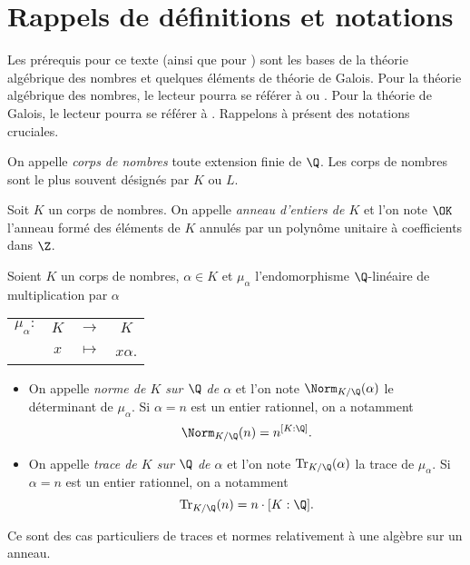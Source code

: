 \section*{Rappels de définitions et notations}\label{section-notations}

Les prérequis pour ce texte (ainsi que pour \cite{article}) sont les bases de la théorie algébrique des nombres et quelques éléments de théorie de Galois. Pour la théorie algébrique des nombres, le lecteur pourra se référer à \cite[ch. II, III, V et VI]{Samuel} ou \cite[ch. II, III et IV]{Kraus}. Pour la théorie de Galois, le lecteur pourra se référer à \cite[ch. XXIII à XVII]{GrandCombat}. Rappelons à présent des notations cruciales.

\begin{rappel}
	On appelle \emph{corps de nombres} toute extension finie de $\Q$. Les corps de nombres sont le plus souvent désignés par $K$ ou $L$.
\end{rappel}

\begin{rappel}
	Soit $K$ un corps de nombres. On appelle \emph{anneau d'entiers de $K$} et l'on note $\OK$ l'anneau formé des éléments de $K$ annulés par un polynôme unitaire à coefficients dans $\Z$.
\end{rappel}

\begin{rappel} Soient $K$ un corps de nombres, $\alpha\in K$ et $\mu_\alpha$ l'endomorphisme $\Q$-linéaire de multiplication par $\alpha$ 
\begin{center}
	\begin{tabular}{rccc}
		$\mu_\alpha : $ & $K$ & $\longrightarrow$ & $K$ \\
		& $x$	& $\longmapsto$ & $x\alpha$.
	\end{tabular}
\end{center}

\begin{itemize}
	\item On appelle \emph{norme de $K$ sur $\Q$ de $\alpha$} et l'on note $\Norm_{K/\Q}(\alpha)$ le déterminant de $\mu_\alpha$. Si $\alpha=n$ est un entier rationnel, on a notamment \[\Norm_{K/\Q}(n) = n^{[K : \Q]}.\]
	\item On appelle \emph{trace de $K$ sur $\Q$ de $\alpha$} et l'on note $\mathrm{Tr}_{K/\Q}(\alpha)$ la trace de $\mu_\alpha$. Si $\alpha= n$ est un entier rationnel, on a notamment \[\mathrm{Tr}_{K/\Q}(n) = n\cdot{[K : \Q]}.\]
\end{itemize}

	Ce sont des cas particuliers de traces et normes relativement à une algèbre sur un anneau.
\end{rappel}


